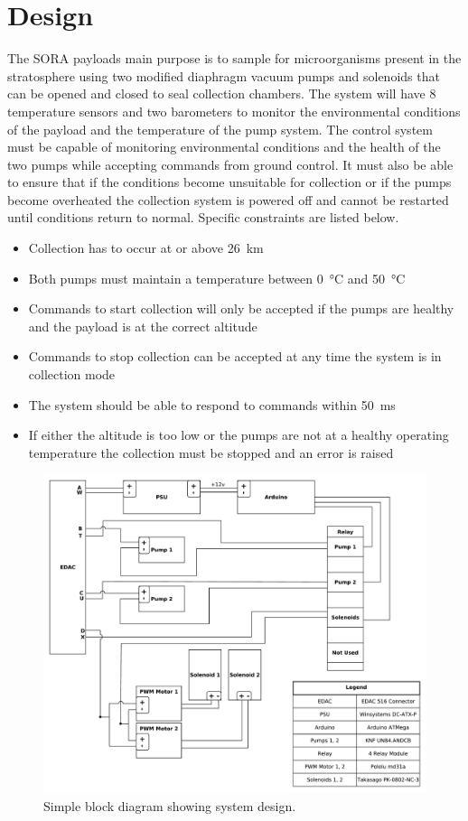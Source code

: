 \documentclass{article}
\begin{document}
\section{Design}
The SORA payloads main purpose is to sample for microorganisms present in the stratosphere using two modified diaphragm vacuum pumps and solenoids that can be opened and closed to seal collection chambers. The system will have 8 temperature sensors and two barometers to monitor the environmental conditions of the payload and the temperature of the pump system. The control system must be capable of monitoring environmental conditions and the health of the two pumps while accepting commands from ground control. It must also be able to ensure that if the conditions become unsuitable for collection or if the pumps become overheated the collection system is powered off and cannot be restarted until conditions return to normal. Specific constraints are listed below.

\begin{itemize}
\item Collection has to occur at or above \SI{26}{\kilo\meter}
\item Both pumps must maintain a temperature between \SI{0}{\celsius} and \SI{50}{\celsius}
\item Commands to start collection will only be accepted if the pumps are healthy and the payload is at the correct altitude
\item Commands to stop collection can be accepted at any time the system is in collection mode
\item The system should be able to respond to commands within \SI{50}{\milli\second}
\item If either the altitude is too low or the pumps are not at a healthy operating temperature the collection must be stopped and an error is raised
\end{itemize}

\begin{figure}[H]
\centering
        \includegraphics[scale=.25]{power-distro.pdf}
    \caption{Simple block diagram showing system design.}
    \label{fig:design}
\end{figure}
\end{document}
